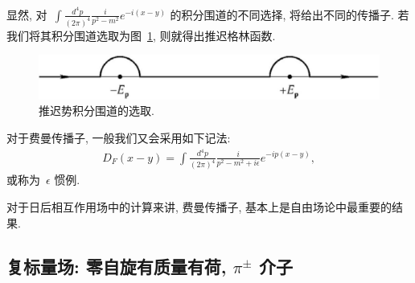 显然, 对~$\int\frac{d^4p}{(2\pi)^4}\frac{i}{p^2-m^2}e^{-i(x-y)}$ 的积分围道的不同选择, 将给出不同的传播子. 若我们将其积分围道选取为图~\ref{ret}, 则就得出推迟格林函数.
\begin{figure}[!h]
\begin{center}
\includegraphics[width=7 cm]{pic/ret.jpg}
\caption{推迟势积分围道的选取.}
\label{ret}
\end{center}
\end{figure}

\noindent 对于费曼传播子, 一般我们又会采用如下记法:
\begin{align}
D_F(x-y)=\int\frac{d^4p}{(2\pi)^4}\frac{i}{p^2-m^2+i\epsilon}e^{-ip(x-y)},
\end{align}
或称为~$\epsilon$ 惯例.

对于日后相互作用场中的计算来讲, 费曼传播子, 基本上是自由场论中最重要的结果.




\subsection{复标量场: 零自旋有质量有荷, $\pi^\pm$ 介子}


